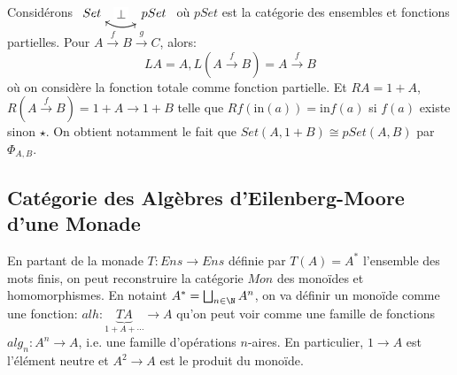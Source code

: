 \documentclass[math, info]{cours}
\begin{document}
\begin{exemple}
	Considérons $\begin{tikzcd}
		Set\ar[r, bend right] & pSet\ar[l, bend left]\ar[l, "\perp" description, phantom]
	\end{tikzcd}$
	où $pSet$ est la catégorie des ensembles et fonctions partielles.
	Pour $A \xrightarrow{f} B \xrightarrow{g} C$, alors:
	\begin{equation*}
		LA = A, L\left( A \xrightarrow{f} B \right) = A \xrightarrow{f} B
	\end{equation*}
	où on considère la fonction totale comme fonction partielle.
	Et $RA = 1 + A$, $R\left( A\xrightarrow{f} B \right) = 1 + A \to 1 + B$ telle que $Rf(\mathrm{in}(a)) = \mathrm{in}f(a)$ si $f(a)$ existe sinon $\star$.
	On obtient notamment le fait que $Set(A, 1 + B) \cong pSet(A, B)$ par $\Phi_{A, B}$.
\end{exemple}

\subsection{Catégorie des Algèbres d'Eilenberg-Moore d'une Monade}
En partant de la monade $T: Ens \to Ens$ définie par $T(A) = A^{*}$ l'ensemble des mots finis, on peut reconstruire la catégorie $Mon$ des monoïdes et homomorphismes.
En notaint $A^{*} = \bigsqcup_{n \in \N} A^{n}$, on va définir un monoïde comme une fonction: $alh: \underbrace{TA}_{1 + A + \cdots} \to A$ qu'on peut voir comme une famille de fonctions $alg_{n}: A^{n} \to A$, i.e. une famille d'opérations $n$-aires.
En particulier, $1 \to A$ est l'élément neutre et $A^{2} \to A$ est le produit du monoïde.
\end{document}
